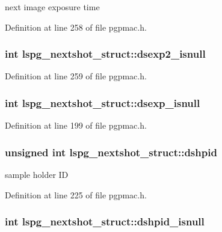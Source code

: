 next image exposure time 



Definition at line 258 of file pgpmac.\-h.

\hypertarget{structlspg__nextshot__struct_a45091283dc073e5b7da2cfbe5a75fade}{
\subsubsection[{dsexp2\-\_\-isnull}]{\setlength{\rightskip}{0pt plus 5cm}int lspg\-\_\-nextshot\-\_\-struct\-::dsexp2\-\_\-isnull}}\label{structlspg__nextshot__struct_a45091283dc073e5b7da2cfbe5a75fade}


Definition at line 259 of file pgpmac.\-h.

\hypertarget{structlspg__nextshot__struct_ae07498f62ea9c0e2f702b78c87500794}{
\subsubsection[{dsexp\-\_\-isnull}]{\setlength{\rightskip}{0pt plus 5cm}int lspg\-\_\-nextshot\-\_\-struct\-::dsexp\-\_\-isnull}}\label{structlspg__nextshot__struct_ae07498f62ea9c0e2f702b78c87500794}


Definition at line 199 of file pgpmac.\-h.

\hypertarget{structlspg__nextshot__struct_a5e260a420176f2973cdb100d0a5c4c09}{
\subsubsection[{dshpid}]{\setlength{\rightskip}{0pt plus 5cm}unsigned int lspg\-\_\-nextshot\-\_\-struct\-::dshpid}}\label{structlspg__nextshot__struct_a5e260a420176f2973cdb100d0a5c4c09}


sample holder I\-D 



Definition at line 225 of file pgpmac.\-h.

\hypertarget{structlspg__nextshot__struct_afe16be0382423aa3f25cb3d6cf99430b}{
\subsubsection[{dshpid\-\_\-isnull}]{\setlength{\rightskip}{0pt plus 5cm}int lspg\-\_\-nextshot\-\_\-struct\-::dshpid\-\_\-isnull}}\label{structlspg__nextshot__struct_afe16be0382423aa3f25cb3d6cf99430b}


